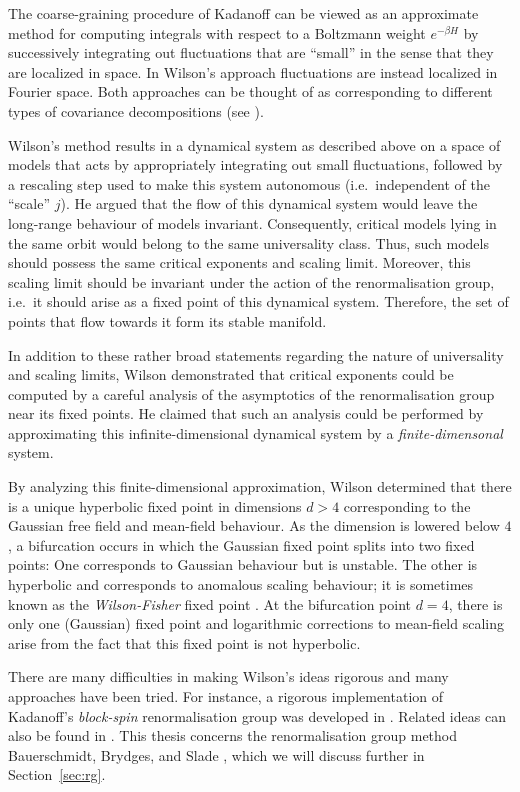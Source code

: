 The coarse-graining procedure of Kadanoff can be viewed as an approximate
method for computing integrals with respect to a Boltzmann weight $e^{-\beta H}$
by successively integrating out fluctuations that are ``small'' in the sense
that they are localized in space. In Wilson's approach fluctuations are instead
localized in Fourier space. Both approaches can be thought of
as corresponding to different types of covariance decompositions (see \cite{BCGNOPS78}).

Wilson's method results in a dynamical system as described above on a space of
models that acts by appropriately integrating out small fluctuations, followed
by a rescaling step used to make this system autonomous (i.e.\ independent of
the ``scale'' $j$). He argued that the flow of this dynamical system would
leave the long-range behaviour of models invariant. Consequently, critical models
lying in the same orbit would belong to
the same universality class. Thus, such models should possess the same critical
exponents and scaling limit. Moreover, this scaling limit should be invariant
under the action of the renormalisation group, i.e.\ it should arise as a fixed
point of this dynamical system. Therefore, the set of points that flow towards it
form its stable manifold.

In addition to these rather broad statements regarding the nature of universality
and scaling limits, Wilson demonstrated that critical exponents could be computed
by a careful analysis of the asymptotics of the renormalisation group near its
fixed points. He claimed that such an analysis could be performed by approximating
this infinite-dimensional dynamical system by a \emph{finite-dimensonal} system.

By analyzing this finite-dimensional approximation, Wilson determined that there
is a unique hyperbolic fixed point in dimensions $d > 4$ corresponding to the Gaussian
free field and mean-field behaviour. As the dimension is lowered below $4$, a
bifurcation occurs in which the Gaussian fixed point splits into two fixed points:
One corresponds to Gaussian behaviour but is unstable. The other is hyperbolic and
corresponds to anomalous scaling behaviour; it is sometimes known as the
\emph{Wilson-Fisher} fixed point \cite{WF72}. At the bifurcation point $d = 4$, there is only
one (Gaussian) fixed point and logarithmic corrections to mean-field scaling arise
from the fact that this fixed point is not hyperbolic.

There are many difficulties in making Wilson's ideas rigorous and many approaches
have been tried. For instance, a rigorous implementation of Kadanoff's \emph{block-spin}
renormalisation group was developed in \cite{GK85}. Related ideas can also be found in
\cite{GJ87,FMRS87}. This thesis concerns the renormalisation group method Bauerschmidt,
Brydges, and Slade \cite{BS-rg-norm,BS-rg-loc,BBS-rg-pt,BS-rg-IE,BS-rg-step}, which we
will discuss further in Section~\ref{sec:rg}.

